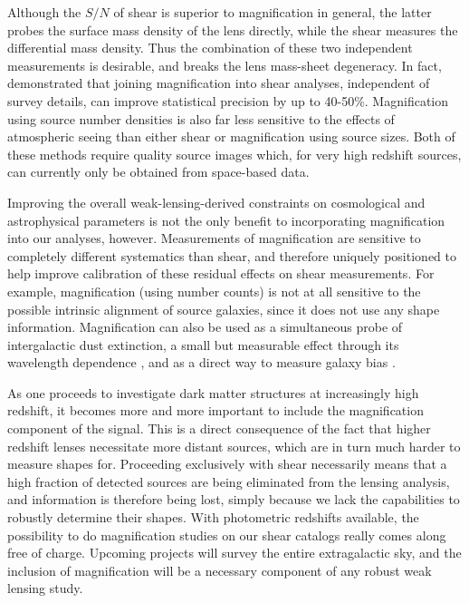 Although the $S/N$ of shear is superior to magnification in general, the latter probes the surface mass density of the lens directly, while the shear measures the differential mass density.  Thus the combination of these two independent measurements is desirable, and breaks the lens mass-sheet degeneracy. In fact, \citet{RozoSchmidt10} demonstrated that joining magnification into shear analyses, independent of survey details, can improve statistical precision by up to 40-50\%. Magnification using source number densities is also far less sensitive to the effects of atmospheric seeing than either shear or magnification using source sizes.  Both of these methods require quality source images which, for very high redshift sources, can currently only be obtained from space-based data.

Improving the overall weak-lensing-derived constraints on cosmological and astrophysical parameters is not the only benefit to incorporating magnification into our analyses, however. Measurements of magnification are sensitive to completely different systematics than shear, and therefore uniquely positioned to help improve calibration of these residual effects on shear measurements. For example, magnification (using number counts) is not at all sensitive to the possible intrinsic alignment of source galaxies, since it does not use any shape information. Magnification can also be used as a simultaneous probe of intergalactic dust extinction, a small but measurable effect through its wavelength dependence \citep{Menard10}, and as a direct way to measure galaxy bias \citep{Waerbeke10}.

As one proceeds to investigate dark matter structures at increasingly high redshift, it becomes more and more important to include the magnification component of the signal. This is a direct consequence of the fact that higher redshift lenses necessitate more distant sources, which are in turn much harder to measure shapes for. Proceeding exclusively with shear necessarily means that a high fraction of detected sources are being eliminated from the lensing analysis, and information is therefore being lost, simply because we lack the capabilities to robustly determine their shapes. With photometric redshifts available, the possibility to do magnification studies on our shear catalogs really comes along free of charge. Upcoming projects will survey the entire extragalactic sky, and the inclusion of magnification will be a necessary component of any robust weak lensing study.
